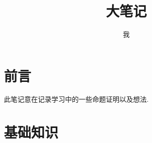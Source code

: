 \documentclass{BigNote}
\title{大笔记}
\author{我}
\begin{document}
    \maketitle

    \tableofcontents
    \newpage

    \chapter*{前言}
    
    此笔记意在记录学习中的一些命题证明以及想法.

    \chapter{基础知识}
    
    

\end{document}
